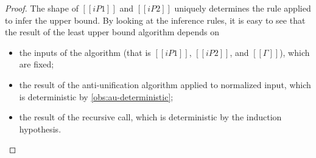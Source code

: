 \obsLubDeterministic*
\begin{proof}
  The shape of $[[iP1]]$ and $[[iP2]]$ uniquely determines the rule 
  applied to infer the upper bound.
  By looking at the inference rules,
  it is easy to see that the result of the least upper bound algorithm depends on 
  \begin{itemize}
    \item the inputs of the algorithm (that is $[[iP1]]$, $[[iP2]]$, and $[[Γ]]$),
      which are fixed;
    \item the result of the anti-unification algorithm
      applied to normalized input, which is deterministic
      by \cref{obs:au-deterministic}; 
    \item the result of the recursive call, which is deterministic by the induction hypothesis.
  \end{itemize}
\end{proof}

